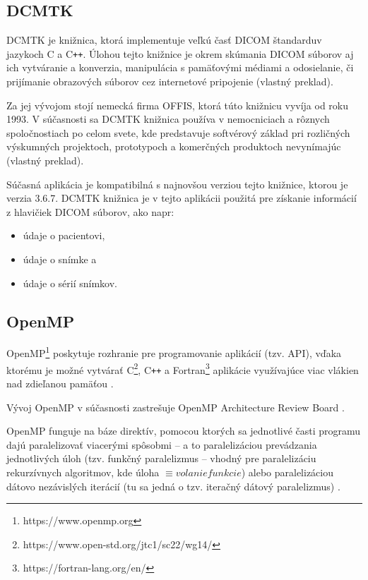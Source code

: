 \clearpage

\subsection {DCMTK}\label{dcmtk}
DCMTK je knižnica, ktorá implementuje veľkú časť DICOM štandardu\newline v jazykoch C a C\texttt{++}. Úlohou tejto knižnice je okrem skúmania DICOM súborov aj ich vytváranie a konverzia, manipulácia s pamäťovými médiami a odosielanie, či prijímanie obrazových súborov cez internetové pripojenie \cite{dcmtk_description} (vlastný preklad).

Za jej vývojom stojí nemecká firma OFFIS, ktorá túto knižnicu vyvíja od roku 1993. V súčasnosti sa DCMTK knižnica používa v nemocniciach a rôznych spoločnostiach po celom svete, kde predstavuje softvérový základ pri rozličných výskumných projektoch, prototypoch a komerčných produktoch nevynímajúc \cite{dcmtk_description} (vlastný preklad).

Súčasná aplikácia je kompatibilná s najnovšou verziou tejto knižnice, ktorou je verzia 3.6.7. DCMTK knižnica je v tejto aplikácii použitá pre získanie informácií z hlavičiek DICOM súborov, ako napr:
\begin{itemize}
\item {údaje o pacientovi,}
\item {údaje o snímke a}
\item {údaje o sérií snímkov.}
\end{itemize}

\subsection {OpenMP}\label{openmp}
OpenMP\footnote{https://www.openmp.org} poskytuje rozhranie pre programovanie aplikácií (tzv. API), vďaka ktorému je možné vytvárať C\footnote{https://www.open-std.org/jtc1/sc22/wg14/}, C\texttt{++} a Fortran\footnote{https://fortran-lang.org/en/} aplikácie využívajúce viac vlákien nad zdieľanou pamäťou \cite{openmp_description}.

Vývoj OpenMP v súčasnosti zastrešuje OpenMP Architecture Review Board \cite{openmp_description}.

\clearpage
OpenMP funguje na báze direktív, pomocou ktorých sa jednotlivé časti programu dajú paralelizovať viacerými spôsobmi -- a to paralelizáciou prevádzania jednotlivých úloh (tzv. funkčný paralelizmus -- vhodný pre paralelizáciu rekurzívnych algoritmov, kde úloha $\equiv{ volanie funkcie}$) alebo paralelizáciou dátovo nezávislých iterácií (tu sa jedná o tzv. iteračný dátový paralelizmus) \cite{openmp_description}.

